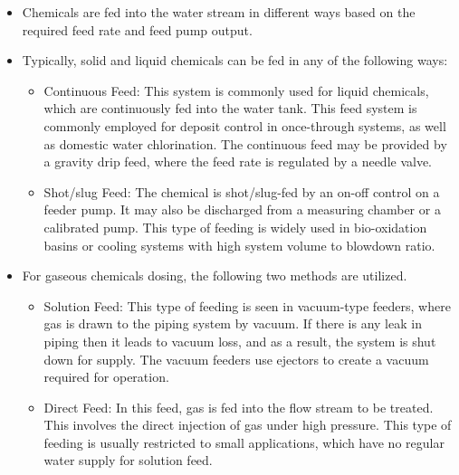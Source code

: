 \begin{itemize}
\item Chemicals are fed into the water stream in different ways based on the required feed rate and feed pump output. 
\item Typically, solid and liquid chemicals can be fed in any of the following ways:
\begin{itemize}
\item Continuous Feed: This system is commonly used for liquid chemicals, which are continuously fed into the water tank. This feed system is commonly employed for deposit control in once-through systems, as well as domestic water chlorination. The continuous feed may be provided by a gravity drip feed, where the feed rate is regulated by a needle valve.
\item Shot/slug Feed: The chemical is shot/slug-fed by an on-off control on a feeder pump. It may also be discharged from a measuring chamber or a calibrated pump. This type of feeding is widely used in bio-oxidation basins or cooling systems with high system volume to blowdown ratio.
\end{itemize}
\item For gaseous chemicals dosing, the following two methods are utilized.
\begin{itemize}
\item Solution Feed: This type of feeding is seen in vacuum-type feeders, where gas is drawn to the piping system by vacuum. If there is any leak in piping then it leads to vacuum loss, and as a result, the system is shut down for supply. The vacuum feeders use ejectors to create a vacuum required for operation.
\item Direct Feed: In this feed, gas is fed into the flow stream to be treated. This involves the direct injection of gas under high pressure. This type of feeding is usually restricted to small applications, which have no regular water supply for solution feed.
\end{itemize}
\end{itemize}

